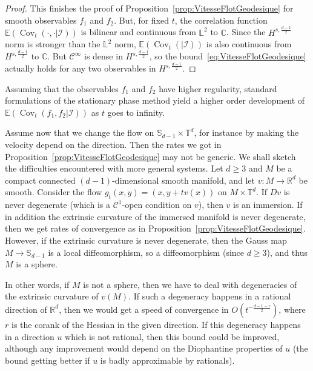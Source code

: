 \documentclass[AHL,Unicode,longabstracts]{cedram}
\DeclareMathOperator{\Cov}{Cov}
\newcommand{\R}{\mathbb{R}}
\newcommand{\Cbb}{\mathbb{C}}
\newcommand{\Ebb}{\mathbb{E}}
\newcommand{\Lbb}{\mathbb{L}}
\newcommand{\Sbb}{\mathbb{S}}
\newcommand{\Tbb}{\mathbb{T}}
\newcommand{\Ccal}{\mathcal{C}}
\newcommand{\Ical}{\mathcal{I}}
\begin{document}
\begin{proof}
This finishes the proof of Proposition~\ref{prop:VitesseFlotGeodesique} for smooth observables $f_1$ and $f_2$. But, for fixed $t$, the correlation function $\Ebb(\Cov_t(\cdot,\cdot|\Ical))$ is bilinear and continuous from $\Lbb^2$ to $\Cbb$. Since the $H^{s,\frac{d-1}{2}}$ norm is stronger than the $\Lbb^2$ norm, $\Ebb(\Cov_t(|\Ical))$ is also continuous from $H^{s,\frac{d-1}{2}}$ to $\Cbb$. But $\Ccal^\infty$ is dense in $H^{s,\frac{d-1}{2}}$, so the bound~\eqref{eq:VitesseFlotGeodesique} actually holds for any two observables in $H^{s,\frac{d-1}{2}}$.
\end{proof}

Assuming that the observables $f_1$ and $f_2$ have higher regularity, standard formulations of the stationary phase method yield a higher order development of $\Ebb(\Cov_t (f_1, f_2|\Ical))$ as $t$ goes to infinity.


Assume now that we change the flow on $\Sbb_{d-1} \times \Tbb^d$, for instance by making the velocity depend on the direction. Then the rates we got in Proposition~\ref{prop:VitesseFlotGeodesique} may not be generic. We shall sketch the difficulties encountered with more general systems. Let $d \geq 3$ and $M$ be a compact connected $(d-1)$-dimensional smooth manifold, and let $v : M \to \R^d$ be smooth. Consider the flow $g_t (x,y)=(x,y+tv(x))$ on $M \times \Tbb^d$. If $Dv$ is never degenerate (which is a $\Ccal^1$-open condition on $v$), then $v$ is an immersion. If in addition the extrinsic curvature of the immersed manifold is never degenerate, then we get rates of convergence as in Proposition~\ref{prop:VitesseFlotGeodesique}. However, if the extrinsic curvature is never degenerate, then the Gauss map $M \to \Sbb_{d-1}$ is a local diffeomorphism, so a diffeomorphism (since $d \geq 3$), and thus $M$ is a sphere.


In other words, if $M$ is not a sphere, then we have to deal with degeneracies of the extrinsic curvature of $v(M)$. If such a degeneracy happens in a rational direction of $\R^d$, then we would get a speed of convergence in $O (t^{-\frac{d-1-r}{2}})$, where $r$ is the corank of the Hessian in the given direction. If this degeneracy happens in a direction $u$ which is not rational, then this bound could be improved, although any improvement would depend on the Diophantine properties of $u$ (the bound getting better if $u$ is badly approximable by rationals).

\end{document}
